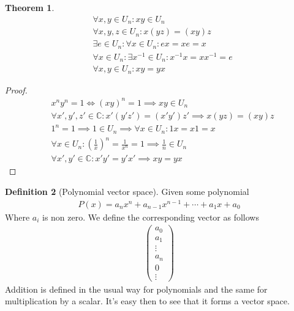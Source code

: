 \documentclass{article}
\theoremstyle{plain}
\newtheorem{theorem}{Theorem}
\theoremstyle{definition}
\newtheorem{definition}[theorem]{Definition}
\newcommand{\C}{\mathbb{C}}
\begin{document}
\begin{theorem}
\begin{align*}
	&\forall x,y \in U_n: xy \in U_n \\
	&\forall x,y,z \in U_n: x(yz) = (xy)z \\
	&\exists e \in U_n: \forall x \in U_n: ex=xe = x \\
	&\forall x \in U_n:\exists x^{-1}\in U_n: x^{-1}x=xx^{-1} = e \\
	&\forall x,y \in U_n: xy = yx 
\end{align*}
\end{theorem}
\begin{proof}
\begin{align*}
	&x^n y^n = 1 \Leftrightarrow {(xy)}^n=1 \implies xy \in U_n \\
	&\forall x',y',z' \in \C: x'(y'z') = (x'y')z' \implies x(yz) = (xy)z\\
	&1^n=1 \implies 1 \in U_n \implies \forall x \in U_n: 1x = x 1 = x \\
	&\forall x \in U_n: {\left(\frac{1}{x}\right)}^n = \frac{1}{x^n} = 1 
	\implies \frac{1}{n} \in U_n \\
	&\forall x',y' \in \C : x'y' = y' x' \implies xy =yx
\end{align*}
\end{proof}
\newpage
\begin{definition}[Polynomial vector space]
	Given some polynomial 
	\begin{equation}
	\begin{aligned}	
		P(x) = a_n x^n+a_{n-1} x^{n-1}+\cdots+a_1x+a_0
	\end{aligned}	
	\end{equation}
	Where $a_i$ is non zero. We define the corresponding vector as follows
	\begin{equation}
	\begin{aligned}	
		\begin{pmatrix}
			a_0 \\
			a_1 \\
			\vdots \\
			a_n \\
			0 \\
			\vdots
		\end{pmatrix}
	\end{aligned}	
	\end{equation}
	Addition is defined in the usual way for polynomials and the same for
	multiplication by a scalar. It's easy then to see that it forms a vector
	space.
\end{definition}
\end{document}
